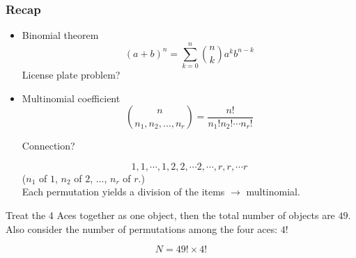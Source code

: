\documentclass[slidestop,compress,mathserif]{beamer}
\begin{document}
\begin{frame}\frametitle{Recap}
\begin{itemize}
\item Binomial theorem
\[
(a + b)^n = \sum_{k = 0}^n {n \choose k} a^k b^{n-k}
\]
License plate problem?

\pause
\item Multinomial coefficient
\[
{n \choose n_1, n_2, \ldots, n_r} = \frac{n!}{n_1!n_2! \cdots n_r!}
\]

Connection?

$$1, 1, \cdots, 1, 2, 2, \cdots 2, \cdots, r, r, \cdots r$$
($n_1$ of $1$, $n_2$ of $2$, ..., $n_r$ of $r$.)\\
\pause
\vspace{1mm}
{\color{red} Each permutation yields a division of the items $\rightarrow$ multinomial. }

\end{itemize}
\end{frame}
\begin{frame}

\pause
Treat the 4 Aces together as one object, then the total number of objects are $49$.\\
Also consider the number of permutations among the four aces: $4!$

\pause
\[N = 49! \times 4!\]

\end{frame}


\end{document}
